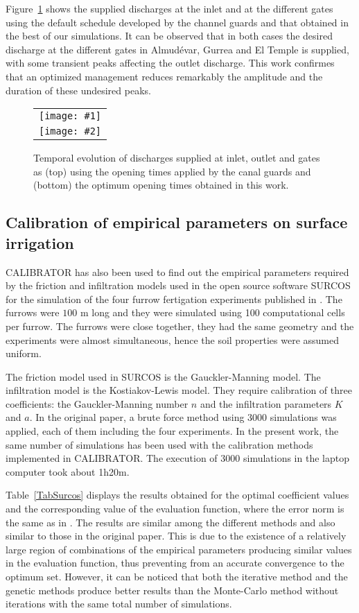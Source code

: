 \documentclass[review,authoryear]{elsarticle}
\newcommand{\FIGII}[4]
{
	\begin{figure}[ht!]
		\centering
		\begin{tabular}{c}
			\texttt{[image: \#1]} \\ \texttt{[image: \#2]}
		\end{tabular}
		\caption{#3.\label{#4}}
	\end{figure}
}
\begin{document}
Figure~\ref{FigSwigs} shows the supplied discharges at the inlet and at the different
gates using the default schedule developed by the channel guards and that 
obtained in the best of our simulations. It can be observed that in both cases 
the desired discharge at the different gates in Almudévar, Gurrea and El Temple is supplied,
with some transient peaks affecting the outlet discharge.
This work confirmes that an optimized management reduces remarkably the amplitude and the duration of these undesired peaks.

\FIGII{Violada-contributions.eps}{Violada-optimized-contributions.eps}
{Temporal evolution of discharges supplied at inlet, outlet and gates as (top)
using the opening times applied by the canal guards and (bottom) the optimum
opening times obtained in this work}{FigSwigs}

\subsection{Calibration of empirical parameters on surface irrigation}

CALIBRATOR has also been used to find out the empirical parameters required by the friction and infiltration
models used in the open source software SURCOS \citep{Surcos,SurcosGit,JaviSurcos3} for the simulation of the four furrow fertigation experiments published in \citet{JaviSurcos2}. The furrows were $100$ m long and they were simulated using 100 computational cells per furrow. The furrows were close together, they had the same geometry and the experiments were almost simultaneous, hence the soil properties were assumed uniform. 

The friction model used in SURCOS is the Gauckler-Manning model. The infiltration model is the Kostiakov-Lewis model. They require calibration of three coefficients: the Gauckler-Manning number $n$ and the infiltration parameters $K$ and $a$. In the original paper, a brute force method using 3000 simulations was applied, each of them including the four experiments. In the present work, the same number of simulations has been used with the calibration methods implemented in CALIBRATOR. The execution of 3000 simulations in the laptop computer took about 1h20m.  

Table~\ref{TabSurcos} displays the results obtained for the optimal coefficient values and the corresponding
value of the evaluation function, where the error norm is the same as in \citet{JaviSurcos2}. The results are similar among the different methods and also similar to those in the original paper. This is due to the existence of a relatively large region of combinations of the empirical parameters producing similar values in the evaluation function, thus preventing from an accurate convergence to the optimum set. However, it can be noticed that both the iterative method and the genetic methods produce better results than the Monte-Carlo method without iterations with the same total number of simulations.
\end{document}

